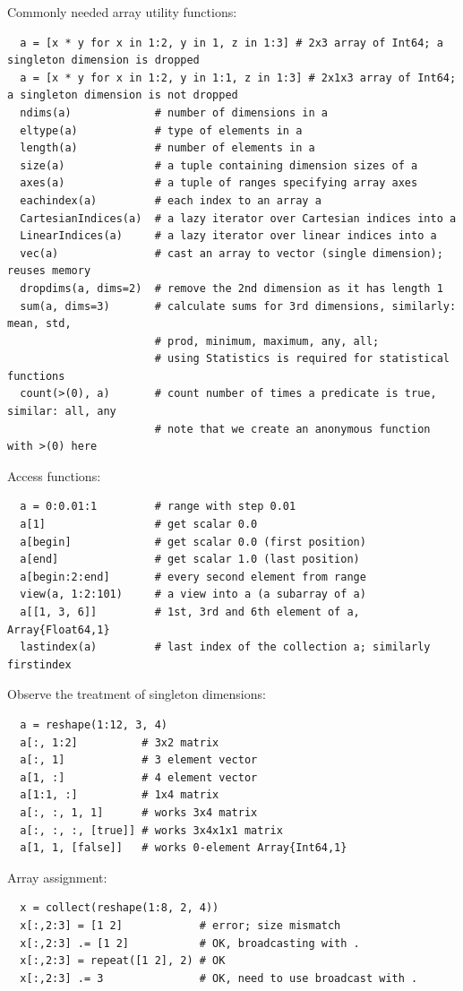 \documentclass[10pt,a4paper]{article}
\begin{document}
Commonly needed array utility functions:
\begin{lstlisting}
  a = [x * y for x in 1:2, y in 1, z in 1:3] # 2x3 array of Int64; a singleton dimension is dropped
  a = [x * y for x in 1:2, y in 1:1, z in 1:3] # 2x1x3 array of Int64; a singleton dimension is not dropped
  ndims(a)             # number of dimensions in a
  eltype(a)            # type of elements in a
  length(a)            # number of elements in a
  size(a)              # a tuple containing dimension sizes of a
  axes(a)              # a tuple of ranges specifying array axes
  eachindex(a)         # each index to an array a
  CartesianIndices(a)  # a lazy iterator over Cartesian indices into a
  LinearIndices(a)     # a lazy iterator over linear indices into a
  vec(a)               # cast an array to vector (single dimension); reuses memory
  dropdims(a, dims=2)  # remove the 2nd dimension as it has length 1
  sum(a, dims=3)       # calculate sums for 3rd dimensions, similarly: mean, std,
                       # prod, minimum, maximum, any, all;
                       # using Statistics is required for statistical functions
  count(>(0), a)       # count number of times a predicate is true, similar: all, any
                       # note that we create an anonymous function with >(0) here
\end{lstlisting}

Access functions:
\begin{lstlisting}
  a = 0:0.01:1         # range with step 0.01
  a[1]                 # get scalar 0.0
  a[begin]             # get scalar 0.0 (first position)
  a[end]               # get scalar 1.0 (last position)
  a[begin:2:end]       # every second element from range
  view(a, 1:2:101)     # a view into a (a subarray of a)
  a[[1, 3, 6]]         # 1st, 3rd and 6th element of a, Array{Float64,1}
  lastindex(a)         # last index of the collection a; similarly firstindex
\end{lstlisting}

Observe the treatment of singleton dimensions:
\begin{lstlisting}
  a = reshape(1:12, 3, 4)
  a[:, 1:2]          # 3x2 matrix
  a[:, 1]            # 3 element vector
  a[1, :]            # 4 element vector
  a[1:1, :]          # 1x4 matrix
  a[:, :, 1, 1]      # works 3x4 matrix
  a[:, :, :, [true]] # works 3x4x1x1 matrix
  a[1, 1, [false]]   # works 0-element Array{Int64,1}
\end{lstlisting}

Array assignment:
\begin{lstlisting}
  x = collect(reshape(1:8, 2, 4))
  x[:,2:3] = [1 2]            # error; size mismatch
  x[:,2:3] .= [1 2]           # OK, broadcasting with .
  x[:,2:3] = repeat([1 2], 2) # OK
  x[:,2:3] .= 3               # OK, need to use broadcast with .
\end{lstlisting}
\end{document}
